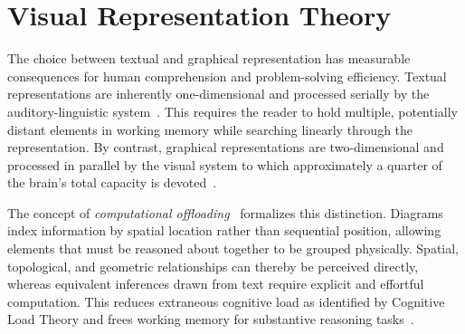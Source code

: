 \section{Visual Representation Theory}
\label{sec:bg_visual}

The choice between textual and graphical representation has measurable consequences for human comprehension and problem-solving efficiency.
Textual representations are inherently one-dimensional and processed serially by the auditory-linguistic system~\cite{larkin_why_1987}.
This requires the reader to hold multiple, potentially distant elements in working memory while searching linearly through the representation.
By contrast, graphical representations are two-dimensional and processed in parallel by the visual system to which approximately a quarter of the brain's total capacity is devoted~\cite{moody_physics_2009}.

The concept of \textit{computational offloading}~\cite{larkin_why_1987} formalizes this distinction.
Diagrams index information by spatial location rather than sequential position, allowing elements that must be reasoned about together to be grouped physically.
Spatial, topological, and geometric relationships can thereby be perceived directly, whereas equivalent inferences drawn from text require explicit and effortful computation.
This reduces extraneous cognitive load as identified by Cognitive Load Theory and frees working memory for substantive reasoning tasks~\cite{sweller_cognitive_2020}.

